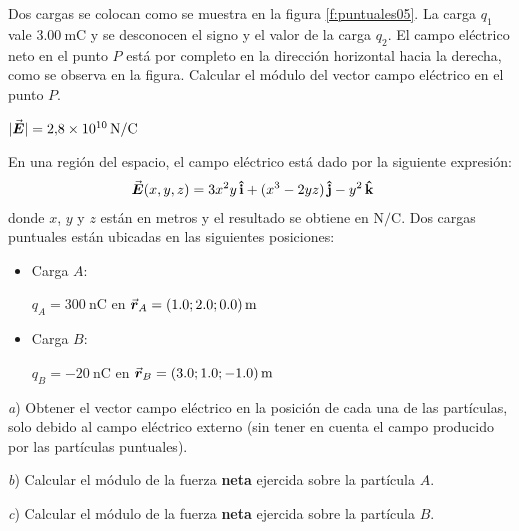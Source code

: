%
\begin{Exercise}\label{p:puntuales05}
  Dos cargas se colocan como se muestra en la figura \ref{f:puntuales05}. La carga $q_1$ vale $\SI{3.00}{\milli\coulomb}$ y se desconocen el signo y el valor de la carga $q_2$. El campo eléctrico neto en el punto $P$ está por completo en la dirección horizontal hacia la derecha, como se observa en la figura. Calcular el módulo del vector campo eléctrico en el punto $P$.
\end{Exercise}
\begin{Answer}
  $|\va*{E}| = \SI{2.8E10}{\newton/\coulomb}$
\end{Answer}
%
\begin{center}
\end{center}
%
\begin{Exercise}
  En una región del espacio, el campo eléctrico está dado por la siguiente expresión:
  \begin{align*}
    \va*{E}(x,y,z) &= 3x^2y\,\vu{i} + (x^3-2yz)\,\vu{j} -y^2\,\vu{k}
  \end{align*}
  donde $x$, $y$ y $z$ están en metros y el resultado se obtiene en $\text{N/C}$. Dos cargas puntuales están ubicadas en las siguientes posiciones:
  \begin{itemize}
    \item Carga $A$:\par $q_A = \SI{300}{\nano\coulomb}$ en $\va*{r}_A = (1.0;2.0;0.0)\,\text{m}$
    \item Carga $B$:\par $q_B = \SI{-20}{\nano\coulomb}$ en $\va*{r}_B = (3.0;1.0;-1.0)\,\text{m}$
  \end{itemize}
  \textit{a}) Obtener el vector campo eléctrico en la posición de cada una de las partículas, solo debido al campo eléctrico externo (sin tener en cuenta el campo producido por las partículas puntuales).\par\medskip
  \textit{b}) Calcular el módulo de la fuerza \textbf{neta} ejercida sobre la partícula $A$.\par\medskip
  \textit{c}) Calcular el módulo de la fuerza \textbf{neta} ejercida sobre la partícula $B$.
\end{Exercise}
